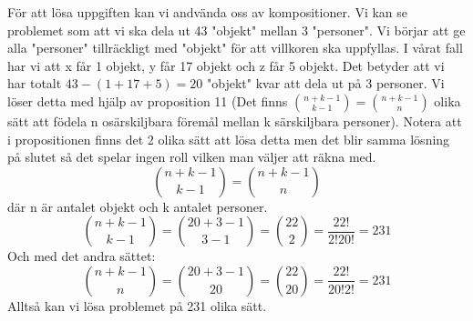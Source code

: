 \documentclass[nobib]{tufte-handout}
\begin{document}
\begin{xca}
För att lösa uppgiften kan vi andvända oss av kompositioner. Vi kan se problemet som att vi ska dela ut 43 "objekt" mellan 3 "personer". Vi börjar att ge alla "personer" tillräckligt med "objekt" för att villkoren ska uppfyllas. I vårat fall har vi att x får 1 objekt, y får 17 objekt och z får 5 objekt. Det betyder att vi har totalt $43-(1+17+5)= 20$ "objekt" kvar att dela ut på 3 personer. Vi löser detta med hjälp av proposition 11 (Det finns $\binom{n+k-1}{k-1}=\binom{n+k-1}{n}$ olika sätt att födela n osärskiljbara föremål mellan k särskiljbara personer). Notera att i propositionen finns det 2 olika sätt att lösa detta men det blir samma lösning på slutet så det spelar ingen roll vilken man väljer att räkna med.
$$\binom{n+k-1}{k-1}=\binom{n+k-1}{n}$$ där n är antalet objekt och k antalet personer.
$$\binom{n+k-1}{k-1}=\binom{20+3-1}{3-1}= \binom{22}{2}=\frac{22!}{2!20!}=231$$
Och med det andra sättet:
$$\binom{n+k-1}{n}=\binom{20+3-1}{20}= \binom{22}{20}=\frac{22!}{20!2!}=231$$
Alltså kan vi lösa problemet på 231 olika sätt.
\end{xca}
\end{document}
